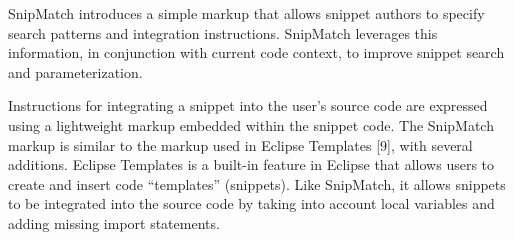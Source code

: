 SnipMatch introduces a simple markup that allows snippet
authors to specify search patterns and integration instructions.
SnipMatch leverages this information, in conjunction
with current code context, to improve snippet search and
parameterization. 


Instructions for integrating a snippet into the user’s source
code are expressed using a lightweight markup embedded
within the snippet code. The SnipMatch markup is similar
to the markup used in Eclipse Templates [9], with several
additions. Eclipse Templates is a built-in feature in Eclipse
that allows users to create and insert code “templates”
(snippets). Like SnipMatch, it allows snippets to be integrated
into the source code by taking into account local
variables and adding missing import statements. 